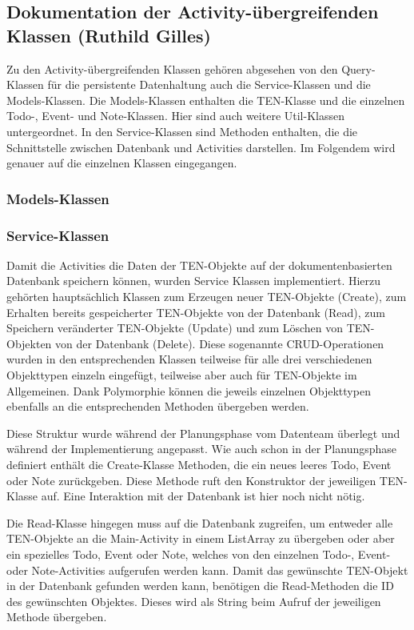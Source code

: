 \newpage
\subsection{Dokumentation der Activity-übergreifenden Klassen (Ruthild Gilles)}

Zu den Activity-übergreifenden Klassen gehören abgesehen von den Query-Klassen für die persistente Datenhaltung auch die Service-Klassen und die Models-Klassen. Die Models-Klassen enthalten die TEN-Klasse und die einzelnen Todo-, Event- und Note-Klassen. Hier sind auch weitere Util-Klassen untergeordnet. In den Service-Klassen sind Methoden enthalten, die die Schnittstelle zwischen Datenbank und Activities darstellen. Im Folgendem wird genauer auf die einzelnen Klassen eingegangen.

\subsubsection{Models-Klassen}

\subsubsection{Service-Klassen}

Damit die Activities die Daten der TEN-Objekte auf der dokumentenbasierten Datenbank speichern können, wurden Service Klassen implementiert. Hierzu gehörten hauptsächlich Klassen zum Erzeugen neuer TEN-Objekte (Create), zum Erhalten bereits gespeicherter TEN-Objekte von der Datenbank (Read), zum Speichern veränderter TEN-Objekte (Update) und zum Löschen von TEN-Objekten von der Datenbank (Delete). Diese sogenannte CRUD-Operationen wurden in den entsprechenden Klassen teilweise für alle drei verschiedenen Objekttypen einzeln eingefügt, teilweise aber auch für TEN-Objekte im Allgemeinen. Dank Polymorphie können die jeweils einzelnen Objekttypen ebenfalls an die entsprechenden Methoden übergeben werden.

Diese Struktur wurde während der Planungsphase vom Datenteam überlegt und während der Implementierung angepasst. Wie auch schon in der Planungsphase definiert enthält die Create-Klasse Methoden, die ein neues leeres Todo, Event oder Note zurückgeben. Diese Methode ruft den Konstruktor der jeweiligen TEN-Klasse auf. Eine Interaktion mit der Datenbank ist hier noch nicht nötig.

Die Read-Klasse hingegen muss auf die Datenbank zugreifen, um entweder alle TEN-Objekte an die Main-Activity in einem ListArray zu übergeben oder aber ein spezielles Todo, Event oder Note, welches von den einzelnen Todo-, Event- oder Note-Activities aufgerufen werden kann. Damit das gewünschte TEN-Objekt in der Datenbank gefunden werden kann, benötigen die Read-Methoden die ID des gewünschten Objektes. Dieses wird als String beim Aufruf der jeweiligen Methode übergeben.

